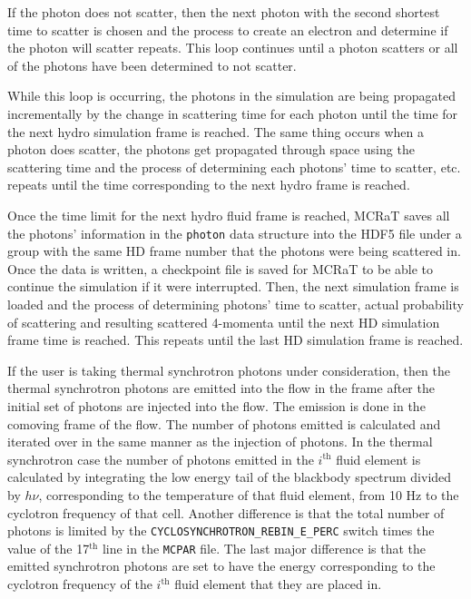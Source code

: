 \documentclass[12pt,a4paper]{article}
\begin{document}
If the photon does not scatter, then the next photon with the second shortest time to scatter is chosen and the process to create an electron and determine if the photon will scatter repeats. This loop continues until a photon scatters or all of the photons have been determined to not scatter. 

While this loop is occurring, the photons in the simulation are being propagated incrementally by the change in scattering time for each photon until the time for the next hydro simulation frame is reached. The same thing occurs when a photon does scatter, the photons get propagated through space using the scattering time and the process of determining each photons' time to scatter, etc. repeats until the time corresponding to the next hydro frame is reached.

Once the time limit for the next hydro fluid frame is reached, MCRaT saves all the photons' information in the \texttt{photon} data structure into the HDF5 file under a group with the same HD frame number that the photons were being scattered in. Once the data is written, a checkpoint file is saved for MCRaT to be able to continue the simulation if it were interrupted. Then, the next simulation frame is loaded and the process of determining photons' time to scatter, actual probability of scattering and resulting scattered 4-momenta until the next HD simulation frame time is reached. This repeats until the last HD simulation frame is reached. 

If the user is taking thermal synchrotron photons under consideration, then the thermal synchrotron photons are emitted into the flow in the frame after the initial set of photons are injected into the flow. The emission is done in the comoving frame of the flow. The number of photons emitted is calculated and iterated over in the same manner as the injection of photons. In the thermal synchrotron case the number of photons emitted in the $i^\mathrm{th}$ fluid element is calculated by integrating the low energy tail of the blackbody spectrum divided by $h\nu$, corresponding to the temperature of that fluid element, from 10 Hz to the cyclotron frequency of that cell. Another difference is that the total number of photons is limited by the \texttt{CYCLOSYNCHROTRON\_REBIN\_E\_PERC} switch times the value of the 17$^\textrm{th}$ line in the \texttt{MCPAR} file. The last major difference is that the emitted synchrotron photons are set to have the energy corresponding to the cyclotron frequency of the $i^\mathrm{th}$ fluid element that they are placed in.
\end{document}
